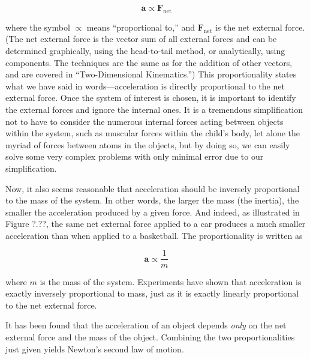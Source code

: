\documentclass[../../main-ap-physics.tex]{subfiles}
\begin{document}
\begin{equation*}
    \textbf{a} \propto \textbf{F}_{\text{net}}
\end{equation*}

where the symbol $\propto$ means ``proportional to,'' and  $\textbf{F}_{\text{net}}$ is the net external force. (The net external force is the vector sum of all external forces and can be determined graphically, using the head-to-tail method, or analytically, using components. The techniques are the same as for the addition of other vectors, and are covered in ``Two-Dimensional Kinematics.'') This proportionality states what we have said in words---acceleration is directly proportional to the net external force. Once the system of interest is chosen, it is important to identify the external forces and ignore the internal ones. It is a tremendous simplification not to have to consider the numerous internal forces acting between objects within the system, such as muscular forces within the child's body, let alone the myriad of forces between atoms in the objects, but by doing so, we can easily solve some very complex problems with only minimal error due to our simplification.

\vspace{1em}

Now, it also seems reasonable that acceleration should be inversely proportional to the mass of the system. In other words, the larger the mass (the inertia), the smaller the acceleration produced by a given force. And indeed, as illustrated in Figure ?.??, the same net external force applied to a car produces a much smaller acceleration than when applied to a basketball. The proportionality is written as

\begin{equation*}
    \textbf{a} \propto \frac{1}{m}
\end{equation*}

where $m$ is the mass of the system. Experiments have shown that acceleration is exactly inversely proportional to mass, just as it is exactly linearly proportional to the net external force.

\vspace{1em} %

It has been found that the acceleration of an object depends \textit{only} on the net external force and the mass of the object. Combining the two proportionalities just given yields Newton's second law of motion.
\end{document}

